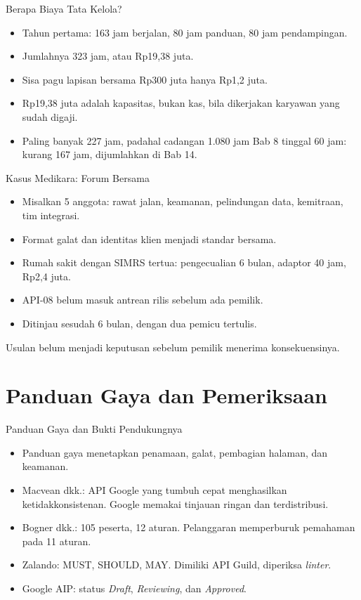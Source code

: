 \documentclass[aspectratio=169, table, 12pt]{beamer}
\begin{document}
\begin{frame}{{\Large Berapa Biaya Tata Kelola?}}
  \vspace{8pt}
  \begin{itemize}
    \item Tahun pertama: 163 jam berjalan, 80 jam panduan, 80 jam pendampingan.
    \item Jumlahnya 323 jam, atau Rp19,38 juta.
    \item Sisa pagu lapisan bersama Rp300 juta hanya Rp1,2 juta.
    \item Rp19,38 juta adalah kapasitas, bukan kas, bila dikerjakan karyawan yang sudah digaji.
    \item Paling banyak 227 jam, padahal cadangan 1.080 jam Bab 8 tinggal 60 jam: kurang 167 jam, dijumlahkan di Bab 14.
  \end{itemize}
\end{frame}

\begin{frame}{{\Large Kasus Medikara: Forum Bersama}}
  \vspace{6pt}
  \begin{itemize}
    \item Misalkan 5 anggota: rawat jalan, keamanan, pelindungan data, kemitraan, tim integrasi.
    \item Format galat dan identitas klien menjadi standar bersama.
    \item Rumah sakit dengan SIMRS tertua: pengecualian 6 bulan, adaptor 40 jam, Rp2,4 juta.
    \item API-08 belum masuk antrean rilis sebelum ada pemilik.
    \item Ditinjau sesudah 6 bulan, dengan dua pemicu tertulis.
  \end{itemize}
  \vspace{4pt}
  {\small Usulan belum menjadi keputusan sebelum pemilik menerima konsekuensinya.}
\end{frame}

\section{Panduan Gaya dan Pemeriksaan}

\begin{frame}{{\Large Panduan Gaya dan Bukti Pendukungnya}}
  \vspace{6pt}
  \begin{itemize}
    \item Panduan gaya menetapkan penamaan, galat, pembagian halaman, dan keamanan.
    \item Macvean dkk.: API Google yang tumbuh cepat menghasilkan ketidakkonsistenan. Google memakai tinjauan ringan dan terdistribusi.
    \item Bogner dkk.: 105 peserta, 12 aturan. Pelanggaran memperburuk pemahaman pada 11 aturan.
    \item Zalando: MUST, SHOULD, MAY. Dimiliki API Guild, diperiksa \textit{linter}.
    \item Google AIP: status \textit{Draft}, \textit{Reviewing}, dan \textit{Approved}.
  \end{itemize}
\end{frame}
\end{document}
